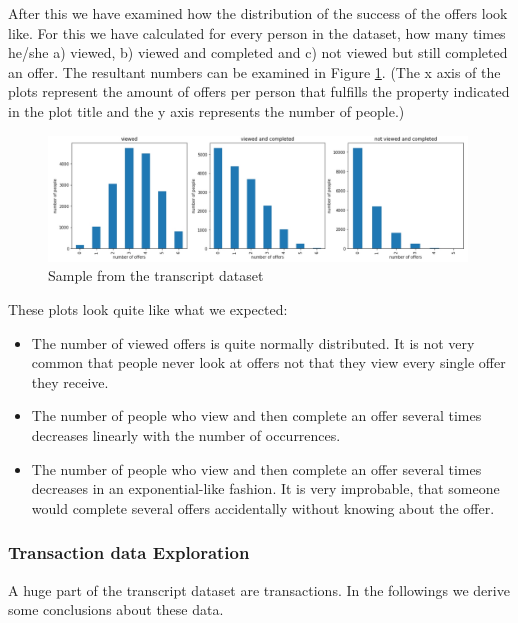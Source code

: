 After this we have examined how the distribution of the success of the offers look like. For this we have calculated for every person in the dataset, how many times he/she a) viewed, b) viewed and completed and c) not viewed but still completed an offer. The resultant numbers can be examined in Figure \ref{fig6}. (The x axis of the plots represent the amount of offers per person that fulfills the property indicated in the plot title and the y axis represents the number of people.)

\begin{figure}[h]
	\centering
	\includegraphics[width=0.99\textwidth]{fig/offer_distributions_2.jpg}
	\vspace*{-0.1in}
	\caption{Sample from the transcript dataset}
	\label{fig6}
	\vspace*{-0.2in}
	\bigskip
\end{figure}

These plots look quite like what we expected:
\begin{itemize}
	\item The number of viewed offers is quite normally distributed. It is not very common that people never look at offers not that they view every single offer they receive.
	\item The number of people who view and then complete an offer several times decreases linearly with the number of occurrences.
	\item  The number of people who view and then complete an offer several times decreases in an exponential-like fashion. It is very improbable, that someone would complete several offers accidentally without knowing about the offer. 
\end{itemize}

\subsubsection{Transaction data Exploration}
A huge part of the transcript dataset are transactions. In the followings we derive some conclusions about these data.

